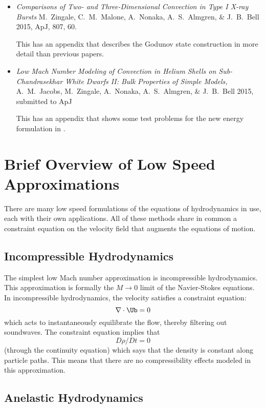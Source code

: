 \begin{itemize}
\item {\it Comparisons of Two- and Three-Dimensional Convection in
  Type I X-ray Bursts} M.~Zingale, C.~M.~Malone, A.~Nonaka,
  A.~S.~Almgren, \& J.~B.~Bell 2015, ApJ, 807, 60.

  This has an appendix that describes the Godunov state construction in more
  detail than previous papers.

\item {\it Low Mach Number Modeling of Convection in Helium Shells on
  Sub-Chandrasekhar White Dwarfs II: Bulk Properties of Simple Models,
} A.~M.~Jacobs, M.~Zingale, A.~Nonaka, A.~S.~Almgren, \& J.~B.~Bell
  2015, submitted to ApJ

  This has an appendix that shows some test problems for the new energy 
  formulation in \maestro.

\end{itemize}


\section{Brief Overview of Low Speed Approximations}

There are many low speed formulations of the equations of hydrodynamics
in use, each with their own applications.  All of these methods share in
common a constraint equation on the velocity field that augments the
equations of motion.  

\subsection{Incompressible Hydrodynamics}

The simplest low Mach number approximation is incompressible
hydrodynamics. This approximation is formally the $M \rightarrow 0$
limit of the Navier-Stokes equations. In incompressible hydrodynamics,
the velocity satisfies a constraint equation:
\begin{equation}
\nabla \cdot \Ub = 0
\end{equation}
which acts to instantaneously equilibrate the flow, thereby filtering
out soundwaves.  The constraint equation implies that
\begin{equation}
D\rho/Dt = 0
\end{equation}
(through the continuity equation) which says that the density is
constant along particle paths. This means that there are no
compressibility effects modeled in this approximation.


\subsection{Anelastic Hydrodynamics}

